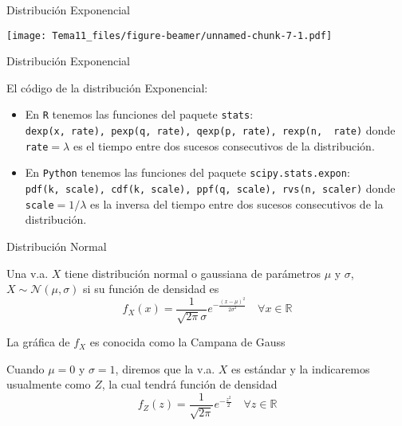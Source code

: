 \documentclass[
  ignorenonframetext,
]{beamer}
\providecommand{\tightlist}{%
  \setlength{\itemsep}{0pt}\setlength{\parskip}{0pt}}
\begin{document}
\begin{frame}{Distribución Exponencial}
\protect\hypertarget{distribuciuxf3n-exponencial-2}{}

\texttt{[image: Tema11\_files/figure-beamer/unnamed-chunk-7-1.pdf]}

\end{frame}

\begin{frame}[fragile]{Distribución Exponencial}
\protect\hypertarget{distribuciuxf3n-exponencial-3}{}

El código de la distribución Exponencial:

\begin{itemize}
\tightlist
\item
  En \texttt{R} tenemos las funciones del paquete \texttt{stats}:
  \texttt{dexp(x,\ rate),\ pexp(q,\ rate),\ qexp(p,\ rate),\ rexp(n,\ \ rate)}
  donde \texttt{rate}\(=\lambda\) es el tiempo entre dos sucesos
  consecutivos de la distribución.
\item
  En \texttt{Python} tenemos las funciones del paquete
  \texttt{scipy.stats.expon}:
  \texttt{pdf(k,\ scale),\ cdf(k,\ scale),\ ppf(q,\ scale),\ rvs(n,\ scaler)}
  donde \texttt{scale}\(=1/\lambda\) es la inversa del tiempo entre dos
  sucesos consecutivos de la distribución.
\end{itemize}

\end{frame}

\begin{frame}{Distribución Normal}
\protect\hypertarget{distribuciuxf3n-normal}{}

Una v.a. \(X\) tiene distribución normal o gaussiana de parámetros
\(\mu\) y \(\sigma\), \(X\sim\mathcal{N}(\mu,\sigma)\) si su función de
densidad es
\[f_X(x)=\frac{1}{\sqrt{2\pi}\sigma}e^{-\frac{(x-\mu)^2}{2\sigma^2}}\quad \forall x\in\mathbb{R}\]

La gráfica de \(f_X\) es conocida como la Campana de Gauss

Cuando \(\mu = 0\) y \(\sigma = 1\), diremos que la v.a. \(X\) es
estándar y la indicaremos usualmente como \(Z\), la cual tendrá función
de densidad
\[f_Z(z)=\frac{1}{\sqrt{2\pi}}e^{-\frac{z^2}{2}}\quad \forall z\in\mathbb{R}\]

\end{frame}
\end{document}
